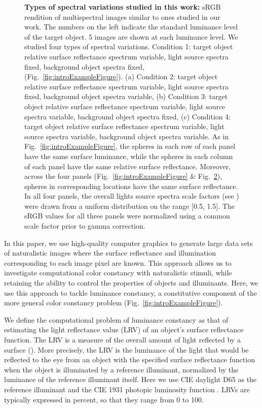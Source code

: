 \documentclass{jov}
\begin{document}
\begin{figure}
\begin{subfigure}[b]{0.33 \textwidth}
        \label{fig:allSpectraVarying}
    \end{subfigure}    
    \caption{{\bf Types of spectral variations studied in this work:} sRGB rendition of multispectral images similar to ones studied in our work. The numbers on the left indicate the standard luminance level of the target object. 5 images are shown at each luminance level. We studied four types of spectral variations. Condition 1: target object relative surface reflectance spectrum variable, light source spectra fixed, background object spectra fixed, (Fig.~\ref{fig:introExampleFigure}). (a) Condition 2: target object relative surface reflectance spectrum variable, light source spectra fixed, background object spectra variable, (b) Condition 3: target object relative surface reflectance spectrum variable, light source spectra variable, background object spectra fixed, (c) Condition 4: target object relative surface reflectance spectrum variable, light source spectra variable, background object spectra variable. As in Fig.~\ref{fig:introExampleFigure}, the spheres in each row of each panel have the same surface luminance, while the spheres in each column of each panel have the same relative surface reflectance.  Moreover, across the four panels (Fig.~\ref{fig:introExampleFigure} \& Fig.~\ref{fig:studiedCases}), spheres in corresponding locations have the same surface reflectance. In all four panels, the overall lights source spectra scale factors (see ) were drawn from a uniform distribution on the range [0.5, 1.5]. The sRGB values for all three panels were normalized using a common scale factor prior to gamma correction.} 
\label{fig:studiedCases}
\end{figure}

In this paper, we use high-quality computer graphics to generate large data sets of naturalistic images where the surface reflectance and illumination corresponding to each image pixel are known. 
This approach allows us to investigate computational color constancy with naturalistic stimuli, while retaining the ability to control the properties of objects and illuminants. Here, we use this approach to tackle luminance constancy, a constitutive component of the more general color constancy problem (Fig.~\ref{fig:introExampleFigure}). 

We define the computational problem of luminance constancy as that of estimating the light reflectance value (LRV) of an object's surface reflectance function.
The LRV is a measure of the overall amount of light reflected by a surface (\citeauthor{astm1121477}).
More precisely, the LRV is the luminance of the light that would
be reflected to the eye from an object with the specified surface reflectance function when the object is illuminated by a reference illuminant,
normalized by the luminance of the reference illuminant itself.
Here we use CIE daylight D65 as the reference illuminant and the CIE 1931 photopic luminosity function \cite{CIE86}.
LRVs are typically expressed in percent, so that they range from 0 to 100.
\end{document}
